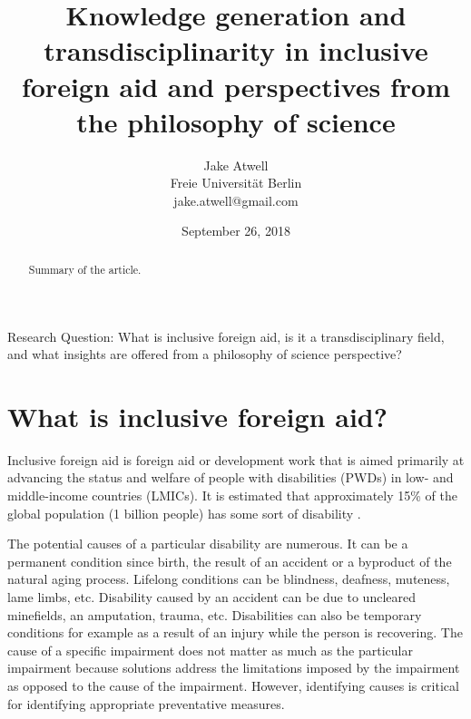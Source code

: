 \documentclass[a4paper]{article}
\begin{document}
\title{Knowledge generation and transdisciplinarity in inclusive foreign aid
and perspectives from the philosophy of science}
\author{Jake Atwell\\
    Freie Universität Berlin\\
    jake.atwell@gmail.com
}
\date{September 26, 2018}

\maketitle



\begin{abstract}
Summary of the article.
\end{abstract}
\newpage

\noindent Research Question: What is inclusive foreign aid, is it a
transdisciplinary field, and what insights are offered from a philosophy of
science perspective?

\tableofcontents

\newpage
{} %




\section{What is inclusive foreign aid?}

Inclusive foreign aid is foreign aid or development work that is aimed
primarily at advancing the status and welfare of people with disabilities
(PWDs) in low- and middle-income countries (LMICs). It is estimated that
approximately 15\% of the global population (1 billion people)
has some sort of disability \citep{banks2017poverty}.

The potential causes of a particular disability are numerous. It can be a
permanent condition since birth, the result of an accident or a byproduct of
the natural aging process. Lifelong conditions can be blindness, deafness,
muteness, lame limbs, etc. Disability caused by an accident can be due to
uncleared minefields, an amputation, trauma, etc. Disabilities can also be
temporary conditions for example as a result of an injury while the person is
recovering. The cause of a specific impairment does not matter as much as the
particular impairment because solutions address the limitations imposed by the
impairment as opposed to the cause of the impairment. However, identifying
causes is critical for identifying appropriate preventative measures.
\end{document}
